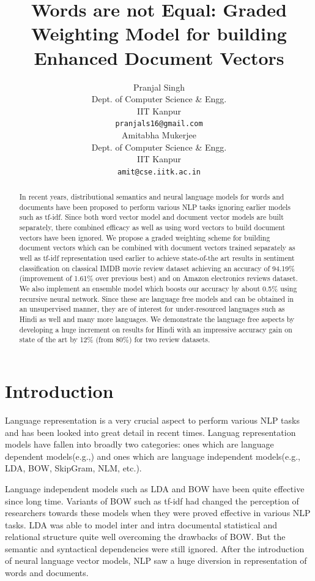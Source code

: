 \documentclass[11pt,a4paper]{article}
\title{Words are not Equal: Graded Weighting Model for building Enhanced Document Vectors}
\author{Pranjal Singh \\
  Dept. of Computer Science \& Engg. \\
  IIT Kanpur \\
  {\tt pranjals16@gmail.com} \\\And
  Amitabha Mukerjee \\
  Dept. of Computer Science \& Engg. \\
  IIT Kanpur \\
  {\tt amit@cse.iitk.ac.in} \\}
\date{}
\begin{document}
\maketitle
\begin{abstract}
In recent years, distributional semantics and neural language models for words and documents have been proposed to perform various NLP tasks ignoring earlier models such as tf-idf. Since both word vector model and document vector models are built separately, there combined efficacy as well as using word vectors to build document vectors have been ignored. We propose a graded weighting scheme for building document vectors which can be combined with document vectors trained separately as well as tf-idf representation used earlier to achieve state-of-the art results in sentiment classification on classical IMDB movie review dataset achieving an accuracy of 94.19\%(improvement of 1.61\% over previous best) and on Amazon electronics reviews dataset. We also implement an ensemble model which boosts our accuracy by about 0.5\% using recursive neural network. Since these are language free models and can be obtained in an unsupervised manner, they are of interest for under-resourced languages such as Hindi as well and many more languages. We demonstrate the language free aspects by developing a huge increment on results for Hindi with an impressive accuracy gain on state of the art by 12\% (from 80\%) for two review datasets.
\end{abstract}

\section{Introduction}
Language representation is a very crucial aspect to perform various NLP tasks and has been looked into great detail in recent times. Languag representation models have fallen into broadly two categories: ones which are language dependent models(e.g.,\cite{Socher:13}) and ones which are language independent models(e.g., LDA, BOW, SkipGram, NLM, etc.). 

Language independent models such as LDA  and BOW have been quite effective since long time. Variants of BOW such as tf-idf had changed the perception of researchers towards these models when they were proved effective in various NLP tasks. LDA was able to model inter and intra documental statistical and relational structure quite well overcoming the drawbacks of BOW. But the semantic and syntactical dependencies were still ignored. After the introduction of neural language vector models, NLP saw a huge diversion in representation of words and documents.
\end{document}
